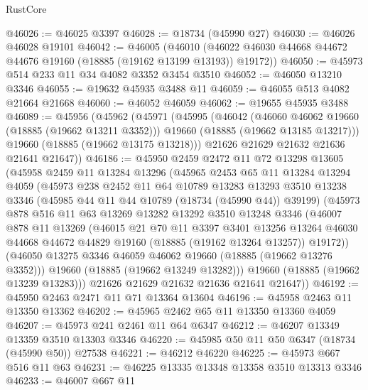 \begin{lexlean}{RustCore}
\begin{coremodule}
@46026 := @46025 @3397
@46028 := @18734 (@45990 @27)
@46030 := @46026 @46028 @19101
@46042 := @46005
    (@46010 (@46022 @46030 @44668 @44672 @44676 @19160 (@18885 (@19162 @13199 @13193)) @19172))
@46050 := @45973 @514 @233 @11 @34 @4082 @3352 @3454 @3510
@46052 := @46050 @13210 @3346
@46055 := @19632 @45935 @3488 @11
@46059 := @46055 @513 @4082 @21664 @21668
@46060 := @46052 @46059
@46062 := @19655 @45935 @3488
@46089 := @45956
    (@45962
      (@45971
        (@45995
          (@46042
            (@46060 @46062 @19660 (@18885 (@19662 @13211 @3352)))
            @19660
            (@18885 (@19662 @13185 @13217)))
          @19660
          (@18885 (@19662 @13175 @13218)))
        @21626
        @21629
        @21632
        @21636
        @21641
        @21647))
@46186 := @45950
    @2459
    @2472
    @11
    @72
    @13298
    @13605
    (@45958
      @2459
      @11
      @13284
      @13296
      (@45965
        @2453
        @65
        @11
        @13284
        @13294
        @4059
        (@45973
          @238
          @2452
          @11
          @64
          @10789
          @13283
          @13293
          @3510
          @13238
          @3346
          (@45985 @44 @11 @44 @10789 (@18734 (@45990 @44)) @39199)
          (@45973
            @878
            @516
            @11
            @63
            @13269
            @13282
            @13292
            @3510
            @13248
            @3346
            (@46007
              @878
              @11
              @13269
              (@46015
                @21
                @70
                @11
                @3397
                @3401
                @13256
                @13264
                @46030
                @44668
                @44672
                @44829
                @19160
                (@18885 (@19162 @13264 @13257))
                @19172))
            (@46050 @13275 @3346 @46059 @46062 @19660 (@18885 (@19662 @13276 @3352)))
            @19660
            (@18885 (@19662 @13249 @13282)))
          @19660
          (@18885 (@19662 @13239 @13283)))
        @21626
        @21629
        @21632
        @21636
        @21641
        @21647))
@46192 := @45950 @2463 @2471 @11 @71 @13364 @13604
@46196 := @45958 @2463 @11 @13350 @13362
@46202 := @45965 @2462 @65 @11 @13350 @13360 @4059
@46207 := @45973 @241 @2461 @11 @64 @6347
@46212 := @46207 @13349 @13359 @3510 @13303 @3346
@46220 := @45985 @50 @11 @50 @6347 (@18734 (@45990 @50)) @27538
@46221 := @46212 @46220
@46225 := @45973 @667 @516 @11 @63
@46231 := @46225 @13335 @13348 @13358 @3510 @13313 @3346
@46233 := @46007 @667 @11

\end{coremodule}
\end{lexlean}
